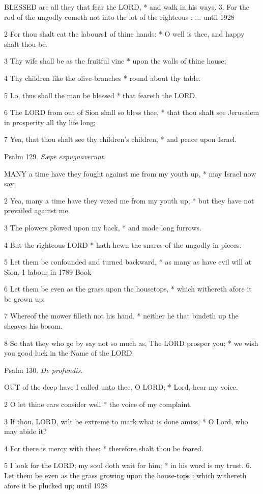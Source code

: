 BLESSED
are all they that fear the LORD, * and walk in his ways. 3. For the rod of the ungodly
cometh not into the lot of the righteous : ... until
1928

2 For thou shalt eat the labours1 of thine hands: * O well is
thee, and happy shalt thou be.

3 Thy wife shall be as the fruitful vine * upon the walls
of thine house;

4 Thy children like the olive-branches * round about
thy table.

5 Lo, thus shall the man be blessed * that feareth the
LORD.

6 The LORD from out of Sion shall so bless thee, * that
thou shalt see Jerusalem in prosperity all thy life long;

7 Yea, that thou shalt see thy children's children, *
and peace upon Israel.

Psalm
129. \emph{Sæpe expugnaverunt.}

MANY
a time have they fought against me from my youth up, * may Israel now
say;

2 Yea, many a time have they vexed me from my youth
up; * but they have not prevailed against me.

3 The plowers plowed upon my back, * and made long
furrows.

4 But the righteous LORD * hath hewn the snares of
the ungodly in pieces.

5 Let them be confounded and turned backward, * as
many as have evil will at Sion. 1 labour
in 1789 Book

6 Let
them be even as the grass upon the housetops, * which withereth afore
it be grown up;

7 Whereof the mower filleth not his hand, * neither
he that bindeth up the sheaves his bosom.

8 So that they who go by say not so much as, The LORD
prosper you; * we wish you good luck in the Name of the LORD.

Psalm
130. \emph{De profundis.}

OUT
of the deep have I called unto thee, O LORD; * Lord, hear my voice.

2 O let thine ears consider well * the voice of my
complaint.

3 If thou, LORD, wilt be extreme to mark what is done
amiss, * O Lord, who may abide it?

4 For there is mercy with thee; * therefore shalt thou
be feared.

5 I look for the LORD; my soul doth wait for him; *
in his word is my trust. 6. Let them be even as the
grass growing upon the house-tops : which withereth afore it be plucked
up; until
1928

